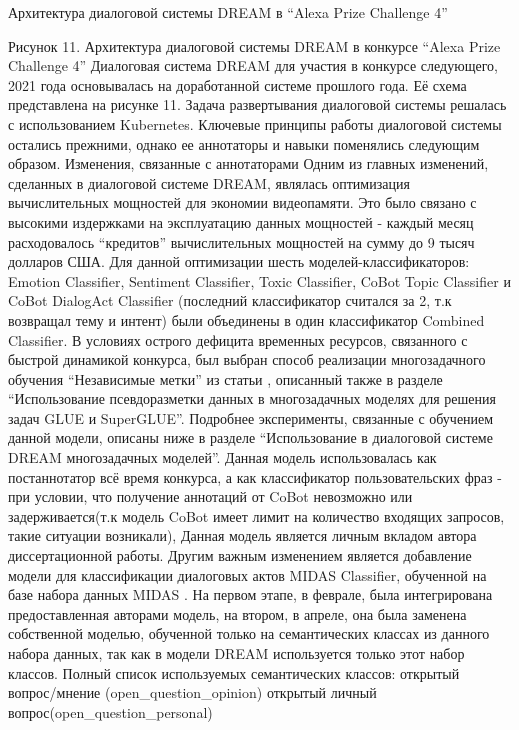 Архитектура диалоговой системы DREAM в “Alexa Prize Challenge 4”


Рисунок 11. Архитектура диалоговой системы DREAM в конкурсе “Alexa Prize Challenge 4”
Диалоговая система DREAM для участия в конкурсе следующего, 2021 года основывалась на доработанной системе прошлого года. Её схема представлена на рисунке 11.
Задача развертывания диалоговой системы решалась с использованием Kubernetes. \cite{Kubernetes - Wikipedia}
Ключевые принципы работы диалоговой системы остались прежними, однако ее аннотаторы и навыки поменялись следующим образом.
Изменения, связанные с аннотаторами
Одним из главных изменений, сделанных в диалоговой системе DREAM, являлась оптимизация вычислительных мощностей для экономии видеопамяти. Это было связано с высокими издержками на эксплуатацию данных мощностей - каждый месяц расходовалось “кредитов” вычислительных мощностей на сумму до 9 тысяч долларов США. Для данной оптимизации шесть моделей-классификаторов: Emotion Classifier, Sentiment Classifier, Toxic Classifier, CoBot Topic Classifier и CoBot DialogAct Classifier (последний классификатор считался за 2, т.к возвращал тему и интент) были объединены в один классификатор Combined Classifier. В условиях острого дефицита временных ресурсов, связанного с быстрой динамикой конкурса, был выбран способ реализации многозадачного обучения “Независимые метки” из статьи  \cite{Karpov_Burtsev_2021}, описанный также в разделе “Использование псевдоразметки данных в многозадачных моделях для решения задач     GLUE и SuperGLUE”. Подробнее эксперименты, связанные с обучением данной модели, описаны ниже в разделе “Использование в диалоговой системе DREAM многозадачных моделей”. Данная модель использовалась как постаннотатор всё время конкурса, а как классификатор пользовательских фраз - при условии, что получение аннотаций от CoBot невозможно или задерживается(т.к модель CoBot имеет лимит на количество входящих запросов, такие ситуации возникали),  Данная модель является личным вкладом автора диссертационной работы. 
Другим важным изменением является добавление модели для классификации диалоговых актов MIDAS Classifier, обученной на базе набора данных MIDAS \cite{Yu_Yu_2019}. На первом этапе, в феврале, была интегрирована предоставленная авторами модель, на втором, в апреле, она была заменена собственной моделью, обученной только на семантических классах из данного набора данных, так как в модели DREAM используется только этот набор классов. 
Полный список используемых семантических классов:
открытый вопрос/мнение (open_question_opinion)
открытый личный вопрос(open_question_personal)
